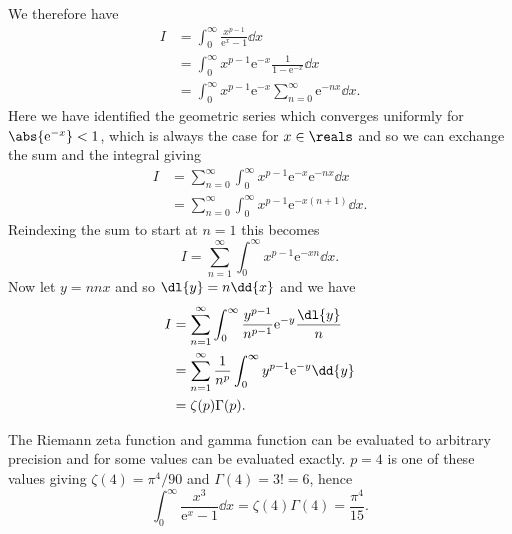 \documentclass[fleqn]{NotesClass}
\newcommand*{\e}{\mathrm{e}}
\begin{document}
    We therefore have
    \begin{align}
        I &= \int_{0}^{\infty} \frac{x^{p - 1}}{\e^{x} - 1} \dd{x}\\
        &= \int_{0}^{\infty} x^{p - 1} \e^{-x} \frac{1}{1 - \e^{-x}} \dd{x}\\
        &= \int_{0}^{\infty} x^{p - 1} \e^{-x} \sum_{n = 0}^{\infty} \e^{-nx} \dd{x}.
    \end{align}
    Here we have identified the geometric series which converges uniformly for \(\abs{\e^{-x}} < 1\), which is always the case for \(x \in \reals\) and so we can exchange the sum and the integral giving
    \begin{align}
        I &= \sum_{n = 0}^{\infty} \int_{0}^{\infty} x^{p - 1} \e^{-x} \e^{-nx} \dd{x}\\
        &= \sum_{n = 0}^{\infty} \int_{0}^{\infty} x^{p - 1} \e^{-x(n + 1)} \dd{x}.
    \end{align}
    Reindexing the sum to start at \(n = 1\) this becomes
    \begin{equation}
        I = \sum_{n = 1}^{\infty} \int_{0}^{\infty} x^{p - 1} \e^{-xn} \dd{x}.
    \end{equation}
    Now let \(y = nnx\) and so \(\dl{y} = n\dd{x}\) and we have
    \begin{align}
        I &= \sum_{n = 1}^{\infty} \int_{0}^{\infty} \frac{y^{p - 1}}{n^{p - 1}} \e^{-y} \frac{\dl{y}}{n}\\
        &= \sum_{n = 1}^{\infty} \frac{1}{n^p} \int_{0}^{\infty} y^{p - 1} \e^{-y} \dd{y}\\
        &= \zeta(p)\Gamma(p).
    \end{align}
    
    The Riemann zeta function and gamma function can be evaluated to arbitrary precision and for some values can be evaluated exactly.
    \(p = 4\) is one of these values giving \(\zeta(4) = \pi^4/90\) and \(\Gamma(4) = 3! = 6\), hence
    \begin{equation}
        \int_{0}^{\infty} \frac{x^3}{\e^{x} - 1} \dd{x} = \zeta(4)\Gamma(4) = \frac{\pi^4}{15}.
    \end{equation}

    
    
%        
    
    \backmatter
    \renewcommand{\glossaryname}{Acronyms}
    \printglossary[acronym]
    \printindex
\end{document}
